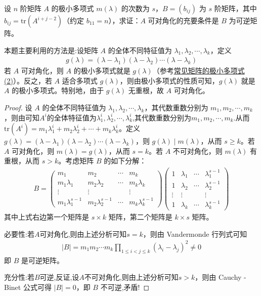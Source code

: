 \documentclass[../../main.tex]{subfiles}%
\begin{document}
\begin{proposition}
设 $n$ 阶矩阵 $A$ 的极小多项式 $m(\lambda)$ 的次数为 $s$，$B = (b_{ij})$ 为 $s$ 阶矩阵，其中 $b_{ij}=\mathrm{tr}(A^{i + j - 2})$（约定 $b_{11}=n$），求证：$A$ 可对角化的充要条件是 $B$ 为可逆矩阵。
\end{proposition}
\begin{remark}
本题主要利用的方法是:设矩阵 $A$ 的全体不同特征值为 $\lambda_1,\lambda_2,\cdots,\lambda_k$，定义
\begin{align*}
g(\lambda)=(\lambda - \lambda_1)(\lambda - \lambda_2)\cdots(\lambda - \lambda_k)
\end{align*}
若 $A$ 可对角化，则 $A$ 的极小多项式就是 $g(\lambda)$（参考\hyperref[proposition:常见矩阵的极小多项式]{常见矩阵的极小多项式(2)}）。反之，若 $A$ 适合多项式 $g(\lambda)$，则由极小多项式的性质可知，$g(\lambda)$ 就是 $A$ 的极小多项式。特别地，由于 $g(\lambda)$ 无重根，故 $A$ 可对角化。
\end{remark}
\begin{proof}
设 $A$ 的全体不同特征值为 $\lambda_1,\lambda_2,\cdots,\lambda_k$，其代数重数分别为 $m_1,m_2,\cdots,m_k$，则由可知$A^i$的全体特征值为$\lambda^i_1,\lambda^i_2,\cdots,\lambda^i_k$,其代数重数分别为$m_1,m_2,\cdots,m_k$.从而$\mathrm{tr}(A^i)=m_1\lambda_1^i + m_2\lambda_2^i + \cdots + m_k\lambda_k^i$。定义 $g(\lambda)=(\lambda - \lambda_1)(\lambda - \lambda_2)\cdots(\lambda - \lambda_k)$，则 $g(\lambda)\mid m(\lambda)$，从而 $s\geqslant  k$。若 $A$ 可对角化，则 $m(\lambda)=g(\lambda)$，从而 $s = k$。若 $A$ 不可对角化，则 $m(\lambda)$ 有重根，从而 $s > k$。考虑矩阵 $B$ 的如下分解：
\begin{align*}
B=\begin{pmatrix}
m_1 & m_2 & \cdots & m_k \\
m_1\lambda_1 & m_2\lambda_2 & \cdots & m_k\lambda_k \\
\vdots & \vdots & & \vdots \\
m_1\lambda_1^{s - 1} & m_2\lambda_2^{s - 1} & \cdots & m_k\lambda_k^{s - 1}
\end{pmatrix}\begin{pmatrix}
1 & \lambda_1 & \cdots & \lambda_1^{s - 1} \\
1 & \lambda_2 & \cdots & \lambda_2^{s - 1} \\
\vdots & \vdots & & \vdots \\
1 & \lambda_k & \cdots & \lambda_k^{s - 1}
\end{pmatrix}
\end{align*}
其中上式右边第一个矩阵是 $s\times k$ 矩阵，第二个矩阵是 $k\times s$ 矩阵。

{\heiti 必要性:}若$A$可对角化,则由上述分析可知$s = k$，则由 Vandermonde 行列式可知
\begin{align*}
|B|=m_1m_2\cdots m_k\prod_{1\leqslant  i < j\leqslant  k}(\lambda_i - \lambda_j)^2\neq 0
\end{align*}
即 $B$ 是可逆矩阵。

{\heiti 充分性:}若$B$可逆,反证,设$A$不可对角化,则由上述分析可知$s > k$，则由 Cauchy - Binet 公式可得 $|B| = 0$，即 $B$ 不可逆,矛盾!
\end{proof}
\end{document}
